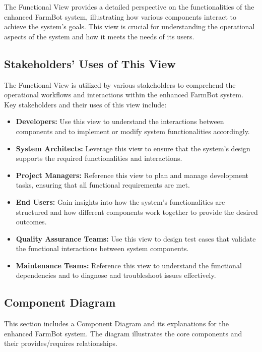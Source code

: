 The Functional View provides a detailed perspective on the functionalities of the enhanced FarmBot system, illustrating how various components interact to achieve the system's goals. This view is crucial for understanding the operational aspects of the system and how it meets the needs of its users.

\subsection{Stakeholders’ Uses of This View}

The Functional View is utilized by various stakeholders to comprehend the operational workflows and interactions within the enhanced FarmBot system. Key stakeholders and their uses of this view include:

\begin{itemize}
    \item \textbf{Developers:} Use this view to understand the interactions between components and to implement or modify system functionalities accordingly.
    \item \textbf{System Architects:} Leverage this view to ensure that the system’s design supports the required functionalities and interactions.
    \item \textbf{Project Managers:} Reference this view to plan and manage development tasks, ensuring that all functional requirements are met.
    \item \textbf{End Users:} Gain insights into how the system's functionalities are structured and how different components work together to provide the desired outcomes.
    \item \textbf{Quality Assurance Teams:} Use this view to design test cases that validate the functional interactions between system components.
    \item \textbf{Maintenance Teams:} Reference this view to understand the functional dependencies and to diagnose and troubleshoot issues effectively.
\end{itemize}

\subsection{Component Diagram}

This section includes a Component Diagram and its explanations for the enhanced FarmBot system. The diagram illustrates the core components and their provides/requires relationships.

